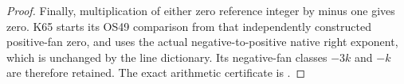 \begin{proof}
Finally, multiplication of either zero reference integer by minus
one gives zero. K65 starts its OS49 comparison from that independently
constructed positive-fan zero, and uses the actual negative-to-positive
native right exponent, which is unchanged by the line dictionary.
Its negative-fan classes \(-3k\) and \(-k\) are therefore retained.
The exact arithmetic certificate is
.
\end{proof}

